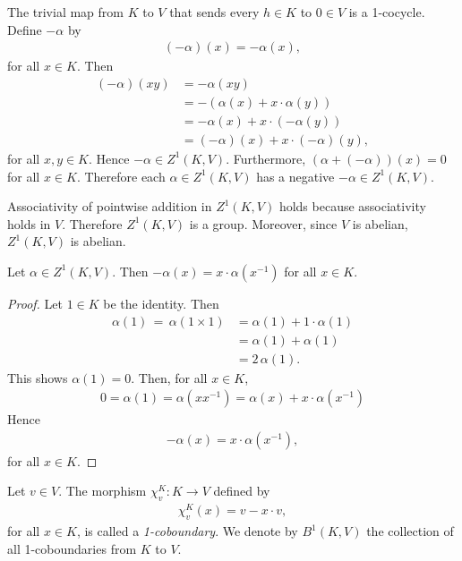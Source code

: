The trivial map from $K$ to $V$ that sends every $h \in K$ to $0 \in V$ is a 1-cocycle. 
Define $-\alpha$ by
\begin{align*}
	(-\alpha)(x) = -\alpha(x),
\end{align*}
for all $x \in K$. Then
\begin{align*}
	(-\alpha)(xy) &= -\alpha(xy) \\
		&= -\left(\alpha(x) + x \cdot \alpha(y)\right) \\
		&= -\alpha(x) + x\cdot (-\alpha(y)) \\
		&= (-\alpha)(x) + x \cdot (-\alpha)(y),
\end{align*}
for all $x,y \in K$. Hence $-\alpha \in Z^1(K, V)$. Furthermore, $(\alpha + (-\alpha))(x) = 0$ for all $x \in K$. Therefore each $\alpha \in Z^1(K, V)$ has a negative $-\alpha\in Z^1(K, V)$.

Associativity of pointwise addition in $Z^1(K, V)$ holds because associativity holds in $V$. Therefore $Z^1\left(K, V\right)$ is a group. Moreover, since $V$ is abelian, $Z^1(K, V)$ is abelian.
\begin{lemma} Let $\alpha \in Z^1(K, V)$. Then $-\alpha(x) = x \cdot \alpha(x^{-1})$ for all $x \in K$.
\end{lemma}
\begin{proof}
Let $1\in K$ be the identity. Then
\begin{align*}
	\alpha(1)\, =\, \alpha(1\times 1) &=  \alpha(1) + 1\cdot \alpha(1) \\
	&=  \alpha(1) + \alpha(1) \\
	&=  2\,\alpha(1).
\end{align*}
This shows $\alpha(1) = 0$. Then, for all $x \in K$,
\begin{align*}
	0 = \alpha(1) = \alpha(xx^{-1}) = \alpha(x) + x \cdot \alpha(x^{-1})
\end{align*}
Hence
\begin{align*}
	-\alpha(x) = x\cdot\alpha(x^{-1}),
\end{align*}
for all $x \in K$. 
\end{proof}

\begin{definition} Let $v \in V$. The morphism $\chi^K_v:K\rightarrow V$ defined by
\begin{align*}
	\chi^K_v (x) = v - x\cdot v,
\end{align*}
for all $x \in K$, is called a \emph{1-coboundary}. We denote by $B^1\left(K, V\right)$ the collection of all 1-coboundaries from $K$ to $V$. 
\end{definition}

